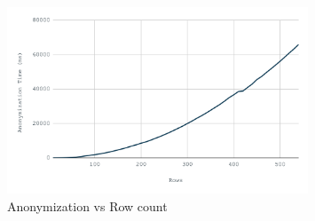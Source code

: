 \begin{figure}[ht]
    \centering
    \includegraphics[width=0.8\textwidth]{images/anon-rows.png}
    \caption{Anonymization vs Row count}\label{fig:anon_rows}
\end{figure}